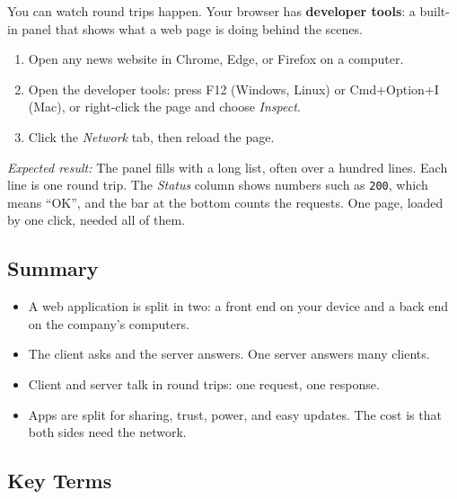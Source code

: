 \label{webapp-01:try-it}

You can watch round trips happen. Your browser has \textbf{developer tools}: a built-in panel that shows what a web page is doing behind the scenes.

\begin{enumerate}
\def\labelenumi{\arabic{enumi}.}
\tightlist
\item
  Open any news website in Chrome, Edge, or Firefox on a computer.
\item
  Open the developer tools: press F12 (Windows, Linux) or Cmd+Option+I (Mac), or right-click the page and choose \emph{Inspect}.
\item
  Click the \emph{Network} tab, then reload the page.
\end{enumerate}

\noindent{}\emph{Expected result:} The panel fills with a long list, often over a hundred lines. Each line is one round trip. The \emph{Status} column shows numbers such as \texttt{200}, which means ``OK'', and the bar at the bottom counts the requests. One page, loaded by one click, needed all of them.

\label{webapp-01:summary-key-terms-and-review-questions}

\subsection*{Summary}\label{webapp-01:summary}

\begin{itemize}
\tightlist
\item
  A web application is split in two: a front end on your device and a back end on the company's computers.
\item
  The client asks and the server answers. One server answers many clients.
\item
  Client and server talk in round trips: one request, one response.
\item
  Apps are split for sharing, trust, power, and easy updates. The cost is that both sides need the network.
\end{itemize}


\subsection*{Key Terms}\label{webapp-01:key-terms}

